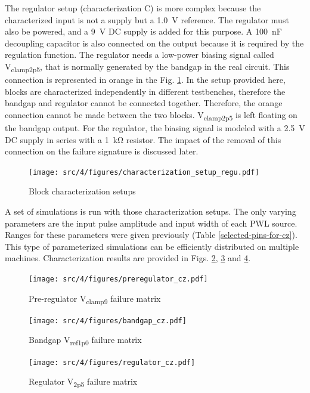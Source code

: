 %
The regulator setup (characterization C) is more complex because the characterized input is not a supply but a \SI{1.0}{\volt} reference.
The regulator must also be powered, and a \SI{9}{\volt} DC supply is added for this purpose.
A \SI{100}{\nano\farad} decoupling capacitor is also connected on the output because it is required by the regulation function.
The regulator needs a low-power biasing signal called V\textsubscript{clamp2p5}, that is normally generated by the bandgap in the real circuit.
This connection is represented in orange in the Fig. \ref{fig:block_function_cz_regu}.
In the setup provided here, blocks are characterized independently in different testbenches, therefore the bandgap and regulator cannot be connected together.
Therefore, the orange connection cannot be made between the two blocks.
V\textsubscript{clamp2p5} is left floating on the bandgap output.
For the regulator, the biasing signal is modeled with a \SI{2.5}{\volt} DC supply in series with a \SI{1}{\kilo\ohm} resistor.
The impact of the removal of this connection on the failure signature is discussed later.

\begin{figure}[!h]
  \centering
  \texttt{[image: src/4/figures/characterization\_setup\_regu.pdf]}
  \caption{Block characterization setups}
  \label{fig:block_function_cz_regu}
\end{figure}

A set of simulations is run with those characterization setups.
The only varying parameters are the input pulse amplitude and input width of each PWL source.
Ranges for these parameters were given previously (Table \ref{selected-pins-for-cz}).
This type of parameterized simulations can be efficiently distributed on multiple machines.
Characterization results are provided in Figs. \ref{pre_regu_wb}, \ref{bandgap_wb} and \ref{regu_wb}.

\begin{figure}[!h]
  \centering
  \texttt{[image: src/4/figures/preregulator\_cz.pdf]}
  \caption{Pre-regulator V\textsubscript{clamp9} failure matrix}
  \label{pre_regu_wb}
\end{figure}

\begin{figure}[!h]
  \centering
  \texttt{[image: src/4/figures/bandgap\_cz.pdf]}
  \caption{Bandgap V\textsubscript{ref1p0} failure matrix}
  \label{bandgap_wb}
\end{figure}

\begin{figure}[!h]
  \centering
  \texttt{[image: src/4/figures/regulator\_cz.pdf]}
  \caption{Regulator V\textsubscript{2p5} failure matrix}
  \label{regu_wb}
\end{figure}

